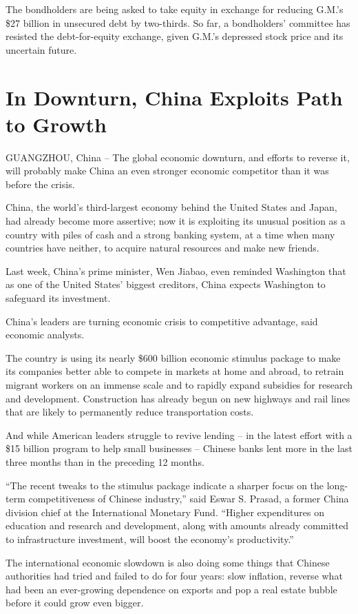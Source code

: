 \documentclass[12pt,a4paper,onecolumn]{article}
\begin{document}
\begin{CJK*}{GBK}{song}
The bondholders are being asked to take equity in exchange for reducing G.M.'s \$27 billion in
unsecured debt by two-thirds. So far, a bondholders' committee has resisted the debt-for-equity
exchange, given G.M.'s depressed stock price and its uncertain future.

\section{In Downturn, China Exploits Path to Growth}

GUANGZHOU, China -- The global economic downturn, and efforts to reverse it, will probably make
China an even stronger economic competitor than it was before the crisis.

China, the world's third-largest economy behind the United States and Japan, had already become more
assertive; now it is exploiting its unusual position as a country with piles of cash and a strong
banking system, at a time when many countries have neither, to acquire natural resources and make
new friends.

Last week, China's prime minister, Wen Jiabao, even reminded Washington that as one of the United
States' biggest creditors, China expects Washington to safeguard its investment.

China's leaders are turning economic crisis to competitive advantage, said economic analysts.

The country is using its nearly \$600 billion economic stimulus package to make its companies better
able to compete in markets at home and abroad, to retrain migrant workers on an immense scale and to
rapidly expand subsidies for research and development. Construction has already begun on new
highways and rail lines that are likely to permanently reduce transportation costs.

And while American leaders struggle to revive lending -- in the latest effort with a \$15 billion
program to help small businesses -- Chinese banks lent more in the last three months than in the
preceding 12 months.

``The recent tweaks to the stimulus package indicate a sharper focus on the long-term
competitiveness of Chinese industry,'' said Eswar S. Prasad, a former China division chief at the
International Monetary Fund. ``Higher expenditures on education and research and development, along
with amounts already committed to infrastructure investment, will boost the economy's
productivity.''

The international economic slowdown is also doing some things that Chinese authorities had tried and
failed to do for four years: slow inflation, reverse what had been an ever-growing dependence on
exports and pop a real estate bubble before it could grow even bigger.


\end{CJK*}
\end{document}
